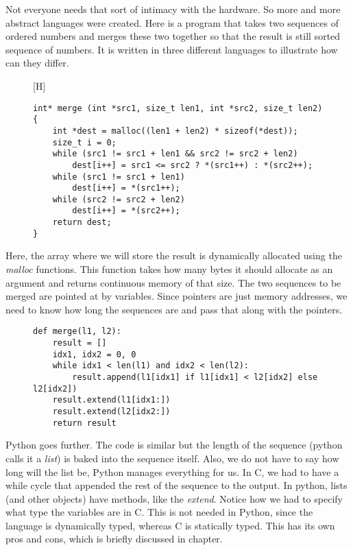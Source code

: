 Not everyone needs that sort of intimacy with the hardware. So more and more abstract languages were created.
Here is a program that takes two sequences of ordered numbers and merges these two together so that the result
is still sorted sequence of numbers. It is written in three different languages to illustrate how can they differ.

\begin{figure}\label{fig:merge-c}[H]
\begin{verbatim}
int* merge (int *src1, size_t len1, int *src2, size_t len2) {
    int *dest = malloc((len1 + len2) * sizeof(*dest));
    size_t i = 0;
    while (src1 != src1 + len1 && src2 != src2 + len2)
        dest[i++] = src1 <= src2 ? *(src1++) : *(src2++);
    while (src1 != src1 + len1)
        dest[i++] = *(src1++);
    while (src2 != src2 + len2)
        dest[i++] = *(src2++);
    return dest;
}
\end{verbatim}
\end{figure}

Here, the array where we will store the result is dynamically allocated using
the \textit{malloc} functions. This function takes how many bytes it should
allocate as an argument and returns continuous memory of that size. The two
sequences to be merged are pointed at by variables. Since pointers are just
memory addresses, we need to know how long the sequences are and pass that
along with the pointers.

\begin{figure}[H]
\begin{verbatim}
def merge(l1, l2):
    result = []
    idx1, idx2 = 0, 0
    while idx1 < len(l1) and idx2 < len(l2):
        result.append(l1[idx1] if l1[idx1] < l2[idx2] else l2[idx2])
    result.extend(l1[idx1:])
    result.extend(l2[idx2:])
    return result
\end{verbatim}
\end{figure}

Python goes further. The code is similar but the length of the sequence (python calls it a \textit{list})
is baked into the sequence itself. Also, we do not have to say how long will the list be,
Python manages everything for us. In C, we had to have a while cycle that appended
the rest of the sequence to the output. In python, lists (and other objects) have methods,
like the \textit{extend}. Notice how we had to specify what type the variables are in C.
This is not needed in Python, since the language is dynamically typed, whereas 
C is statically typed. This has its own pros and cons, which is briefly discussed in  chapter.

